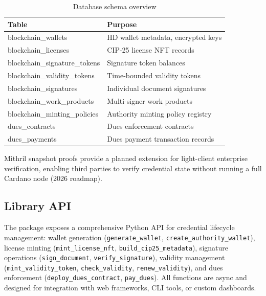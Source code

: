 \documentclass[conference,10pt]{IEEEtran}
\begin{document}
\begin{table}[t]
\centering
\caption{Database schema overview}
\label{tab:schema}
\scriptsize
\begin{tabular}{@{}L{2.8cm}L{4.5cm}@{}}
\toprule
\textbf{Table} & \textbf{Purpose} \\
\midrule
blockchain\_wallets & HD wallet metadata, encrypted keys \\
blockchain\_licenses & CIP-25 license NFT records \\
blockchain\_signature\_tokens & Signature token balances \\
blockchain\_validity\_tokens & Time-bounded validity tokens \\
blockchain\_signatures & Individual document signatures \\
blockchain\_work\_products & Multi-signer work products \\
blockchain\_minting\_policies & Authority minting policy registry \\
dues\_contracts & Dues enforcement contracts \\
dues\_payments & Dues payment transaction records \\
\bottomrule
\end{tabular}
\end{table}

Mithril snapshot proofs provide a planned extension for light-client enterprise verification, enabling third parties to verify credential state without running a full Cardano node (2026 roadmap).

\subsection{Library API}

The package exposes a comprehensive Python API for credential lifecycle management: wallet generation (\texttt{generate\_wallet}, \texttt{create\_authority\_wallet}), license minting (\texttt{mint\_license\_nft}, \texttt{build\_cip25\_metadata}), signature operations (\texttt{sign\_document}, \texttt{verify\_signature}), validity management (\texttt{mint\_validity\_token}, \texttt{check\_validity}, \texttt{renew\_validity}), and dues enforcement (\texttt{deploy\_dues\_contract}, \texttt{pay\_dues}). All functions are async and designed for integration with web frameworks, CLI tools, or custom dashboards.

\end{document}
